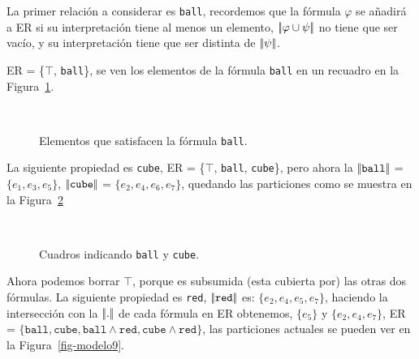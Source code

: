 La primer relaci\'on a considerar es \texttt{ball}, recordemos que la f\'ormula $\varphi$ se a\~nadir\'a a ER si su interpretaci\'on 
tiene al menos un elemento, $|\!|\varphi \cup \psi|\!|$ no tiene que ser vac\'io, y su interpretaci\'on tiene que ser distinta 
de $|\!|\psi|\!|$. 

ER = \{$\top$, \texttt{ball}\}, se ven los elementos de la f\'ormula \texttt{ball} en un recuadro en la Figura~\ref{fig-modelo3}.

\begin{figure}[ht]
\begin{center}
\\[0pt]
\caption{Elementos que satisfacen la f\'ormula \texttt{ball}.}
\label{fig-modelo3}
\end{center}
\end{figure}

La siguiente propiedad es \texttt{cube}, ER = \{$\top$, \texttt{ball}, \texttt{cube}\}, pero ahora la $|\!|\texttt{ball}|\!|$ = $\{e_1,e_3,e_5\}$, 
$|\!|\texttt{cube}|\!|$ = $\{e_2, e_4, e_6, e_7\}$, quedando las particiones como se muestra en la Figura~\ref{fig-modelo4}

%

\begin{figure}[ht]
\begin{center}
\\[0pt]
\caption{Cuadros indicando \texttt{ball} y \texttt{cube}.}
\label{fig-modelo4}
\end{center}
\end{figure}
Ahora podemos borrar $\top$, porque es subsumida (esta cubierta por) las otras dos f\'ormulas. La siguiente propiedad es \texttt{red}, 
$|\!|\texttt{red}|\!|$ es: $\{e_2, e_4, e_5, e_7\}$, haciendo la intersecci\'on con la $|\!|.|\!|$ de cada f\'ormula en ER obtenemos, 
$\{e_5\}$ y $\{e_2, e_4, e_7\}$, ER = $\{\texttt{ball}, \texttt{cube}, \texttt{ball} \wedge \texttt{red}, \texttt{cube} \wedge \texttt{red}\}$, 
las particiones actuales se pueden ver en la Figura~\ref{fig-modelo9}.

